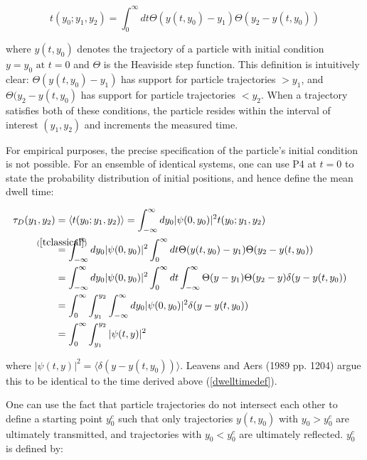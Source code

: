 \documentclass{article}
\begin{document}
\begin{equation}
	t(y_0;y_1,y_2) = \int_0^\infty dt \Theta(y(t,y_0)-y_1)\Theta(y_2-y(t,y_0)) \label{tclassical}
\end{equation}

\noindent where $y(t,y_0)$ denotes the trajectory of a particle with initial condition $y=y_0 \text{ at } t=0$ and $\Theta$ is the Heaviside step function. This definition is intuitively clear: $\Theta(y(t,y_0)-y_1)$ has support for particle trajectories $> y_1$, and $\Theta(y_2-y(t,y_0)$ has support for particle trajectories $<y_2$. When a trajectory satisfies both of these conditions, the particle resides within the interval of interest $(y_1,y_2)$ and increments the measured time.

For empirical purposes, the precise specification of the particle's initial condition is not possible. For an ensemble of identical systems, one can use P4 at $t=0$ to state the probability distribution of initial positions, and hence define the mean dwell time:

\begin{subequations}
\begin{flalign}
	\tau_D(y_1,y_2) &= \langle t(y_0;y_1,y_2) \rangle = \int_{-\infty}^{\infty}dy_{0}|\psi(0,y_0)|^2t(y_0;y_1,y_2)&\\
			&\stackrel{\mathclap{(\ref{tclassical})}}{=} \int_{-\infty}^{\infty}dy_{0}|\psi(0,y_0)|^2 \int_0^\infty dt \Theta(y(t,y_0)-y_1)\Theta(y_2-y(t,y_0)) \\
			&= \int_{-\infty}^{\infty}dy_{0}|\psi(0,y_0)|^2 \int_0^\infty dt \int_{-\infty}^\infty \Theta(y-y_1)\Theta(y_2-y)\delta(y-y(t,y_0))\\
			&= \int_0^\infty \int_{y_1}^{y_2} \int_{-\infty}^\infty dy_{0}|\psi(0,y_0)|^2\delta(y-y(t,y_0))\\
			&= \int_0^\infty \int_{y_1}^{y_2}|\psi(t,y)|^2
\end{flalign}
\end{subequations}

\noindent where $|\psi(t,y)|^2 = \langle \delta(y-y(t,y_0)) \rangle$. Leavens and Aers (1989 pp. 1204) argue this to be identical to the time derived above (\ref{dwelltimedef}).

One can use the fact that particle trajectories do not intersect each other to define a starting point $y_0^c$ such that only trajectories $y(t,y_0)$ with $y_0 > y_0^c$ are ultimately transmitted, and trajectories with $y_0 < y_0^c$ are ultimately reflected. $y_0^c$ is defined by:
\end{document}
